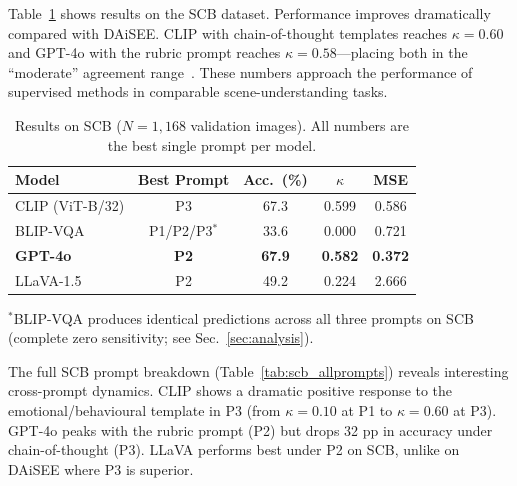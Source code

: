 Table~\ref{tab:scb_main} shows results on the SCB dataset.  Performance
improves dramatically compared with DAiSEE.  CLIP with chain-of-thought
templates reaches $\kappa\!=\!0.60$ and GPT-4o with the rubric prompt
reaches $\kappa\!=\!0.58$---placing both in the ``moderate'' agreement
range~\cite{landis1977measurement}.  These numbers approach the
performance of supervised methods in comparable scene-understanding tasks.

\begin{table}[t]
\centering
\small
\caption{Results on SCB ($N\!=\!1{,}168$ validation images).
  All numbers are the best single prompt per model.}
\label{tab:scb_main}
\setlength{\tabcolsep}{4pt}
\begin{tabular}{@{}lcccc@{}}
\toprule
Model & Best Prompt & Acc.\ (\%) & $\kappa$ & MSE \\
\midrule
CLIP (ViT-B/32)  & P3 & 67.3 & 0.599 & 0.586 \\
BLIP-VQA         & P1/P2/P3$^*$ & 33.6 & 0.000 & 0.721 \\
\textbf{GPT-4o}  & \textbf{P2} & \textbf{67.9} & \textbf{0.582} & \textbf{0.372} \\
LLaVA-1.5        & P2 & 49.2 & 0.224 & 2.666 \\
\bottomrule
\end{tabular}
\vspace{1pt}
\begin{minipage}{\linewidth}
  \scriptsize $^*$BLIP-VQA produces identical predictions across all
  three prompts on SCB (complete zero sensitivity; see Sec.~\ref{sec:analysis}).
\end{minipage}
\end{table}

The full SCB prompt breakdown (Table~\ref{tab:scb_allprompts}) reveals
interesting cross-prompt dynamics.  CLIP shows a dramatic positive
response to the emotional/behavioural template in P3 (from $\kappa\!=\!0.10$
at P1 to $\kappa\!=\!0.60$ at P3).  GPT-4o peaks with the rubric prompt
(P2) but drops 32 pp in accuracy under chain-of-thought (P3).  LLaVA
performs best under P2 on SCB, unlike on DAiSEE where P3 is superior.

